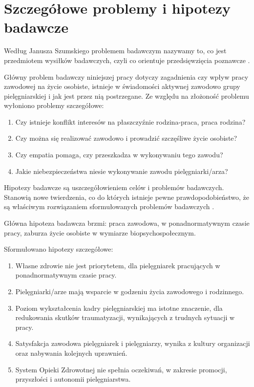 \documentclass[a4paper,12pt,twoside,openright]{mwrep}
\begin{document}
\section{Szczegółowe problemy i hipotezy badawcze}
Według Janusza Szumskiego problemem badawczym nazywamy to, co jest przedmiotem wysiłków badawczych, czyli co orientuje przedsięwzięcia poznawcze \cite{janusz}.

Główny problem badawczy niniejszej pracy dotyczy zagadnienia czy wpływ pracy zawodowej na życie osobiste, istnieje w świadomości aktywnej zawodowo grupy pielęgniarskiej i jak jest przez nią postrzegane. Ze względu na złożoność problemu wyłoniono problemy szczegółowe:
\begin{enumerate}
	\item Czy istnieje konflikt interesów na płaszczyźnie rodzina-praca, praca rodzina?
	\item Czy można się realizować zawodowo i prowadzić szczęśliwe życie osobiste?
	\item Czy empatia pomaga, czy przeszkadza w wykonywaniu tego zawodu?
	\item Jakie niebezpieczeństwa niesie wykonywanie zawodu pielęgniarki/arza?
\end{enumerate}

Hipotezy badawcze są uszczegółowieniem celów i problemów badawczych. Stanowią nowe twierdzenia, co do których istnieje pewne prawdopodobieństwo, że są właściwym rozwiązaniem sformułowanych problemów badawczych \cite{janusz}.

Główna hipoteza badawcza brzmi: praca zawodowa, w ponadnormatywnym czasie pracy, zaburza życie osobiste w wymiarze biopsychospołecznym.

Sformułowano hipotezy szczegółowe:
\begin{enumerate}
	\item Własne zdrowie nie jest priorytetem, dla pielęgniarek pracujących w ponadnormatywnym czasie pracy.
	\item Pielęgniarki/arze mają wsparcie w  godzeniu życia zawodowego i rodzinnego.
	\item Poziom wykształcenia kadry pielęgniarskiej ma istotne znaczenie, dla  redukowania skutków traumatyzacji, wynikających z trudnych sytuacji w pracy.
	\item Satysfakcja zawodowa pielęgniarek i pielęgniarzy, wynika z kultury organizacji oraz nabywania kolejnych uprawnień.
	\item System Opieki Zdrowotnej nie spełnia oczekiwań, w zakresie promocji, przyszłości i autonomii pielęgniarstwa.
\end{enumerate}
\end{document}
